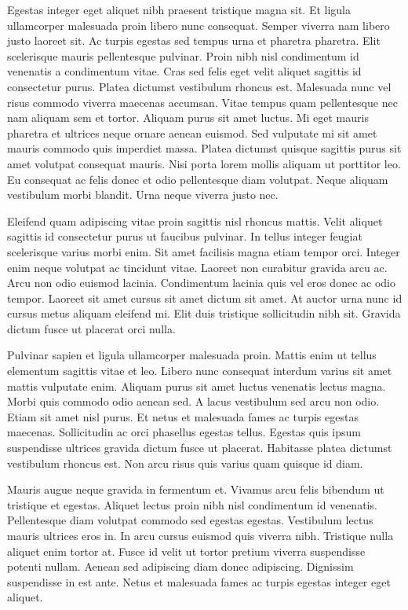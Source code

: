\documentclass[11pt,a4paper]{article}
\begin{document}
Egestas integer eget aliquet nibh praesent tristique magna sit. Et ligula ullamcorper malesuada proin libero nunc consequat. Semper viverra nam libero justo laoreet sit. Ac turpis egestas sed tempus urna et pharetra pharetra. Elit scelerisque mauris pellentesque pulvinar. Proin nibh nisl condimentum id venenatis a condimentum vitae. Cras sed felis eget velit aliquet sagittis id consectetur purus. Platea dictumst vestibulum rhoncus est. Malesuada nunc vel risus commodo viverra maecenas accumsan. Vitae tempus quam pellentesque nec nam aliquam sem et tortor. Aliquam purus sit amet luctus. Mi eget mauris pharetra et ultrices neque ornare aenean euismod. Sed vulputate mi sit amet mauris commodo quis imperdiet massa. Platea dictumst quisque sagittis purus sit amet volutpat consequat mauris. Nisi porta lorem mollis aliquam ut porttitor leo. Eu consequat ac felis donec et odio pellentesque diam volutpat. Neque aliquam vestibulum morbi blandit. Urna neque viverra justo nec.

Eleifend quam adipiscing vitae proin sagittis nisl rhoncus mattis. Velit aliquet sagittis id consectetur purus ut faucibus pulvinar. In tellus integer feugiat scelerisque varius morbi enim. Sit amet facilisis magna etiam tempor orci. Integer enim neque volutpat ac tincidunt vitae. Laoreet non curabitur gravida arcu ac. Arcu non odio euismod lacinia. Condimentum lacinia quis vel eros donec ac odio tempor. Laoreet sit amet cursus sit amet dictum sit amet. At auctor urna nunc id cursus metus aliquam eleifend mi. Elit duis tristique sollicitudin nibh sit. Gravida dictum fusce ut placerat orci nulla.

Pulvinar sapien et ligula ullamcorper malesuada proin. Mattis enim ut tellus elementum sagittis vitae et leo. Libero nunc consequat interdum varius sit amet mattis vulputate enim. Aliquam purus sit amet luctus venenatis lectus magna. Morbi quis commodo odio aenean sed. A lacus vestibulum sed arcu non odio. Etiam sit amet nisl purus. Et netus et malesuada fames ac turpis egestas maecenas. Sollicitudin ac orci phasellus egestas tellus. Egestas quis ipsum suspendisse ultrices gravida dictum fusce ut placerat. Habitasse platea dictumst vestibulum rhoncus est. Non arcu risus quis varius quam quisque id diam.

Mauris augue neque gravida in fermentum et. Vivamus arcu felis bibendum ut tristique et egestas. Aliquet lectus proin nibh nisl condimentum id venenatis. Pellentesque diam volutpat commodo sed egestas egestas. Vestibulum lectus mauris ultrices eros in. In arcu cursus euismod quis viverra nibh. Tristique nulla aliquet enim tortor at. Fusce id velit ut tortor pretium viverra suspendisse potenti nullam. Aenean sed adipiscing diam donec adipiscing. Dignissim suspendisse in est ante. Netus et malesuada fames ac turpis egestas integer eget aliquet.
\end{document}
